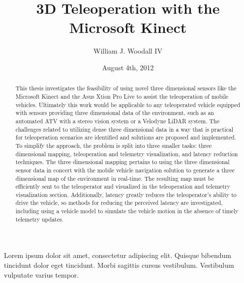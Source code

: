 \documentclass[12pt]{report}
\title{3D Teleoperation with the Microsoft Kinect}
\author{William J. Woodall IV}
\date{August 4th, 2012} %
\begin{document}

\begin{romanpages}      %

\TitlePage 


\begin{abstract} 
This thesis investigates the feasibility of using novel three dimensional sensors like the Microsoft Kinect\cite{KINECT} and the Asus Xtion Pro Live\cite{ASUS} to assist the teleoperation of mobile vehicles.  Ultimately this work would be applicable to any teleoperated vehicle equipped with sensors providing three dimensional data of the environment, such as an automated ATV with a stereo vision system or a Velodyne LiDAR\cite{halterman2010velodyne} system.  The challenges related to utilizing dense three dimensional data in a way that is practical for teleoperation scenarios are identified and solutions are proposed and implemented.  To simplify the approach, the problem is split into three smaller tasks: three dimensional mapping, teleoperation and telemetry visualization, and latency reduction techniques.  The three dimensional mapping pertains to using the three dimensional sensor data in concert with the mobile vehicle navigation solution to generate a three dimensional map of the environment in real-time.  The resulting map must be efficiently sent to the teleoperator and visualized in the teleoperation and telemetry visualization section.  Additionally, latency greatly reduces the teleoperator's ability to drive the vehicle, so methods for reducing the perceived latency are investigated, including using a vehicle model to simulate the vehicle motion in the absence of timely telemetry updates.
\end{abstract}


\begin{acknowledgments}
Lorem ipsum dolor sit amet, consectetur adipiscing elit. Quisque bibendum tincidunt dolor eget tincidunt. Morbi sagittis cursus vestibulum. Vestibulum vulputate varius tempor.
\end{acknowledgments}

\tableofcontents
\listoffigures
\listoftables
\listofalgorithms

\printnomenclature[0.5in] %
\end{romanpages}        %
\end{document}
